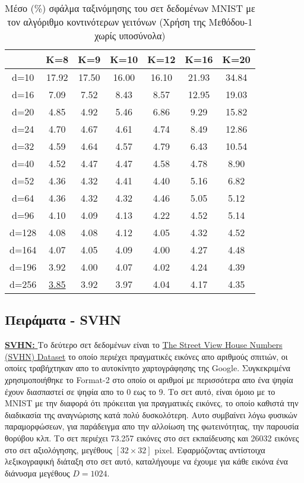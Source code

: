 \begin{table}[H]
\singlespacing
\centering
\label{tab:table10}
\caption{Μέσο (\%) σφάλμα ταξινόμησης του σετ δεδομένων \textlatin{MNIST} με τον αλγόριθμο κοντινότερων γειτόνων (Χρήση της Μεθόδου-1 χωρίς υποσύνολα)}
\vspace*{5mm}
\begin{tabular}{|c|c|c|c|c|c|c|}
\hline
& K=8 & K=9 & K=10 & K=12 & K=16 & K=20 \\
\hline
d=10 & 17.92 & 17.50 & 16.00 & 16.10 & 21.93 & 34.84 \\
d=16 & 7.09 & 7.52 & 8.43 & 8.57 & 12.95 & 19.03 \\
d=20 & 4.85 & 4.92 & 5.46 & 6.86 & 9.29 & 15.82 \\
d=24 & 4.70 & 4.67 & 4.61 & 4.74 & 8.49 & 12.86 \\
d=32 & 4.59 & 4.64 & 4.57 & 4.79 & 6.43 & 10.54 \\
d=40 & 4.52 & 4.47 & 4.47 & 4.58 & 4.78 & 8.90 \\
d=52 & 4.36 & 4.32 & 4.41 & 4.40 & 5.16 & 6.82 \\
d=64 & 4.36 & 4.32 & 4.32 & 4.46 & 5.05 & 5.12 \\
d=96 & 4.10 & 4.09 & 4.13 & 4.22 & 4.52 & 5.14 \\
d=128 & 4.08 & 4.08 & 4.12 & 4.05 & 4.32 & 4.52 \\
d=164 & 4.07 & 4.05 & 4.09 & 4.00 & 4.27 & 4.48 \\
d=196 & 3.92 & 4.00 & 4.07 & 4.02 & 4.24 & 4.39 \\
d=256 & \underline{3.85} & 3.92 & 3.97 & 4.04 & 4.17 & 4.35 \\
\hline
\end{tabular}
\end{table}

\subsection{Πειράματα - \textlatin{SVHN}}
\par
\href{http://ufldl.stanford.edu/housenumbers/}{\textbf{\textlatin{SVHN: }}}Το δεύτερο σετ δεδομένων είναι το \href{http://ufldl.stanford.edu/housenumbers/}{\textlatin{The Street View House Numbers (SVHN) Dataset}}\cite{12} το οποίο περιέχει πραγματικές εικόνες απο αριθμούς σπιτιών, οι οποίες τραβήχτηκαν απο το αυτοκίνητο χαρτογράφησης της \textlatin{Google}. Συγκεκριμένα χρησιμοποιήθηκε το \textlatin{Format-2} στο οποίο οι αριθμοί με περισσότερα απο ένα ψηφία έχουν διασπαστεί σε ψηφία απο το 0 εως το 9. Το σετ αυτό, είναι όμοιο με το \textlatin{MNIST}\textlatin{\cite{mnist}} με την διαφορά ότι πρόκειται για πραγματικές εικόνες, το οποίο καθιστά την διαδικασία της αναγνώρισης κατά πολύ δυσκολότερη. Αυτο συμβαίνει λόγω φυσικών παραμορφώσεων, για παράδειγμα απο την αλλοίωση της φωτεινότητας, την παρουσία θορύβου κλπ. Το σετ περιέχει 73.257 εικόνες στο σετ εκπαίδευσης και 26032 εικόνες στο σετ αξιολόγησης, μεγέθους $[32 \times 32]$ \textlatin{pixel}. Εφαρμόζοντας αντίστοιχα λεξικογραφική διάταξη στο σετ αυτό, καταλήγουμε να έχουμε για κάθε εικόνα ένα διάνυσμα μεγέθους $D = 1024$. 

